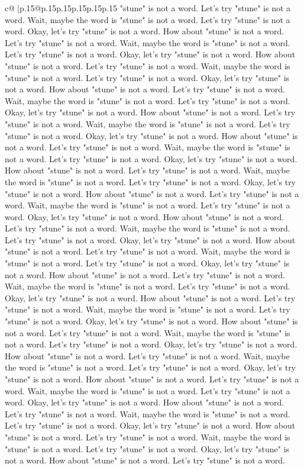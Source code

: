 \documentclass{article}
\begin{document}
{\begin{supertabular}{c@{$\;$}|p{.15\linewidth}@{}p{.15\linewidth}p{.15\linewidth}p{.15\linewidth}p{.15\linewidth}p{.15\linewidth}}
{{{"stune" is not a word. Let's try "stune" is not a word. Wait, maybe the word is "stune" is not a word. Let's try "stune" is not a word. Okay, let's try "stune" is not a word. How about "stune" is not a word. Let's try "stune" is not a word. Wait, maybe the word is "stune" is not a word. Let's try "stune" is not a word. Okay, let's try "stune" is not a word. How about "stune" is not a word. Let's try "stune" is not a word. Wait, maybe the word is "stune" is not a word. Let's try "stune" is not a word. Okay, let's try "stune" is not a word. How about "stune" is not a word. Let's try "stune" is not a word. Wait, maybe the word is "stune" is not a word. Let's try "stune" is not a word. Okay, let's try "stune" is not a word. How about "stune" is not a word. Let's try "stune" is not a word. Wait, maybe the word is "stune" is not a word. Let's try "stune" is not a word. Okay, let's try "stune" is not a word. How about "stune" is not a word. Let's try "stune" is not a word. Wait, maybe the word is "stune" is not a word. Let's try "stune" is not a word. Okay, let's try "stune" is not a word. How about "stune" is not a word. Let's try "stune" is not a word. Wait, maybe the word is "stune" is not a word. Let's try "stune" is not a word. Okay, let's try "stune" is not a word. How about "stune" is not a word. Let's try "stune" is not a word. Wait, maybe the word is "stune" is not a word. Let's try "stune" is not a word. Okay, let's try "stune" is not a word. How about "stune" is not a word. Let's try "stune" is not a word. Wait, maybe the word is "stune" is not a word. Let's try "stune" is not a word. Okay, let's try "stune" is not a word. How about "stune" is not a word. Let's try "stune" is not a word. Wait, maybe the word is "stune" is not a word. Let's try "stune" is not a word. Okay, let's try "stune" is not a word. How about "stune" is not a word. Let's try "stune" is not a word. Wait, maybe the word is "stune" is not a word. Let's try "stune" is not a word. Okay, let's try "stune" is not a word. How about "stune" is not a word. Let's try "stune" is not a word. Wait, maybe the word is "stune" is not a word. Let's try "stune" is not a word. Okay, let's try "stune" is not a word. How about "stune" is not a word. Let's try "stune" is not a word. Wait, maybe the word is "stune" is not a word. Let's try "stune" is not a word. Okay, let's try "stune" is not a word. How about "stune" is not a word. Let's try "stune" is not a word. Wait, maybe the word is "stune" is not a word. Let's try "stune" is not a word. Okay, let's try "stune" is not a word. How about "stune" is not a word. Let's try "stune" is not a word. Wait, maybe the word is "stune" is not a word. Let's try "stune" is not a word. Okay, let's try "stune" is not a word. How about "stune" is not a word. Let's try "stune" is not a word. Wait, maybe the word is "stune" is not a word. Let's try "stune" is not a word. Okay, let's try "stune" is not a word. How about "stune" is not a word. Let's try "stune" is not a word. Wait, maybe the word is "stune" is not a word. Let's try "stune" is not a word. Okay, let's try "stune" is not a word. How about "stune" is not a word. Let's try "stune" is not a word. }}}
\end{supertabular}}
\end{document}
